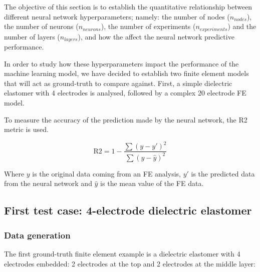 The objective of this section is to establish the quantitative relationship between different neural network hyperparameters; namely: the number of nodes ($n_{nodes}$), the number of neurons ($n_{neurons}$), the number of experiments ($n_{experiments}$) and the number of layers ($n_{layers}$), and how the affect the neural network predictive performance. 

In order to study how these hyperparameters impact the performance of the machine learning model, we have decided to establish two finite element models that will act as ground-truth to compare against. First, a simple dielectric elastomer with 4 electrodes is analysed, followed by a complex 20 electrode FE model. 

To measure the accuracy of the prediction made by the neural network, the R2 metric is used. 

\begin{equation}
  \mbox{R2} = 1 - \dfrac{\sum ( y - y')^2}{\sum (y - \hat{y})^2}
  \label{eq:R2_measurement}
\end{equation}


Where $y$ is the original data coming from an FE analysis, $y'$ is the predicted data from the neural network and $\hat{y}$ is the mean value of the FE data.

\subsection{First test case: 4-electrode dielectric elastomer}

\subsubsection{Data generation}

The first ground-truth finite element example is a dielectric elastomer with 4 electrodes embedded: 2 electrodes at the top and 2 electrodes at the middle layer:

